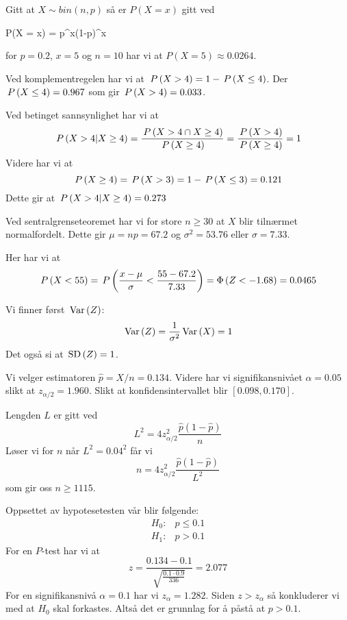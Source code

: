 \oppgave
\deloppgave
Gitt at $X \sim bin(n, p)$ så er $P(X = x)$ gitt ved
\begin{likning}
	P(X = x) = p^x(1-p)^x
\end{likning}
for $p = 0.2$, $x = 5$ og $n = 10$ har vi at $P(X = 5) \approx 0.0264$.

\deloppgave
Ved komplementregelen har vi at $\,P\left(X > 4\right) = 1 - \,P\left(X \leq 4\right)$. Der $\,P\left(X \leq 4\right) = 0.967$ som gir $\,P\left(X > 4\right) = 0.033$.

\deloppgave
Ved betinget sannsynlighet har vi at
$$
\,P\left(X > 4 | X \geq 4\right) = \frac{\,P\left(X > 4 \cap X \geq 4\right)}{\,P\left(X \geq 4\right)} = \frac{\,P\left(X > 4\right)}{\,P\left(X \geq 4\right)} = 1
$$
Videre har vi at 
$$
\,P\left(X \geq 4\right) = \,P\left(X > 3\right) = 1 - \,P\left(X \leq 3\right) = 0.121
$$
Dette gir at $\,P\left(X > 4 | X \geq 4\right) = 0.273$

\deloppgave
Ved sentralgrenseteoremet har vi for store $n \geq 30$ at $X$ blir tilnærmet normalfordelt. Dette gir $\mu = np = 67.2$ og $\sigma^2 = 53.76$ eller $\sigma = 7.33$.

\deloppgave
Her har vi at
$$
\,P\left(X < 55\right) = \,P\left(\frac{x - \mu}{\sigma} < \frac{55-67.2}{7.33}\right) = \Phi\left(Z < -1.68\right) = 0.0465
$$

\deloppgave
Vi finner først $\, \mathrm{Var}\left(Z\right)$:
$$
\, \mathrm{Var}\left(Z\right) = \frac{1}{\sigma^2}\, \mathrm{Var}\left(X\right) = 1
$$
Det også si at $\,\mathrm{SD}\left(Z\right) = 1$.

\deloppgave
Vi velger estimatoren $\hat{p} = X/n = 0.134$. Videre har vi signifikansnivået $\alpha = 0.05$ slikt at $z_{\alpha/2} = 1.960$. Slikt at konfidensintervallet blir $\left[0.098, 0.170\right]$.

\deloppgave
Lengden $L$ er gitt ved
$$
L^2 = 4z_{\alpha/2}^2\frac{\hat{p}(1-\hat{p})}{n}
$$
Løser vi for $n$ når $L^2 = 0.04^2$ får vi
$$
n = 4z_{\alpha/2}^2\frac{\hat{p}(1-\hat{p})}{L^2}
$$
som gir oss $n \geq 1115$.

\deloppgave
Oppsettet av hypotesetesten vår blir følgende:
\begin{align*}
	H_0\colon & p \leq 0.1\\
	H_1\colon & p > 0.1
\end{align*}
For en $P$-test har vi at
$$
z = \frac{0.134 - 0.1}{\sqrt{\frac{0.1\cdot0.9}{336}}} = 2.077
$$
For en signifikansnivå $\alpha = 0.1$ har vi $z_\alpha = 1.282$. Siden $z > z_\alpha$ så konkluderer vi med at $H_0$ skal forkastes. Altså det er grunnlag for å påstå at $p > 0.1$.

\deloppgave


\clearpage